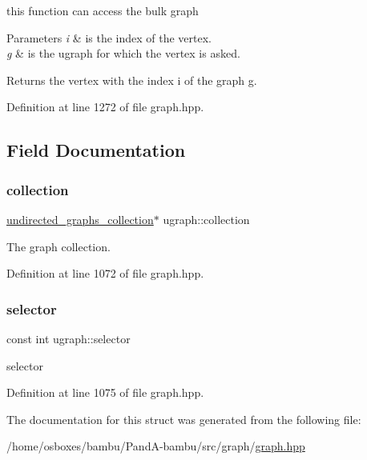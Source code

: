 this function can access the bulk graph 


\begin{DoxyParams}{Parameters}
{\em i} & is the index of the vertex. \\
\hline
{\em g} & is the ugraph for which the vertex is asked. \\
\hline
\end{DoxyParams}
\begin{DoxyReturn}{Returns}
the vertex with the index i of the graph g. 
\end{DoxyReturn}


Definition at line 1272 of file graph.\+hpp.



\subsection{Field Documentation}
\mbox{\label{structugraph_a91e0c8dfe12282bf0b18d38dbac3384a}} 
\subsubsection{\texorpdfstring{collection}{collection}}
{\footnotesize\ttfamily \hyperlink{structundirected__graphs__collection}{undirected\+\_\+graphs\+\_\+collection}$\ast$ ugraph\+::collection\hspace{0.3cm}{\ttfamily [protected]}}



The graph collection. 



Definition at line 1072 of file graph.\+hpp.

\mbox{\label{structugraph_a82bc54b16ffb1a67e1c2e05c98c4b2e6}} 
\subsubsection{\texorpdfstring{selector}{selector}}
{\footnotesize\ttfamily const int ugraph\+::selector\hspace{0.3cm}{\ttfamily [protected]}}



selector 



Definition at line 1075 of file graph.\+hpp.



The documentation for this struct was generated from the following file\+:\begin{DoxyCompactItemize}
\item 
/home/osboxes/bambu/\+Pand\+A-\/bambu/src/graph/\hyperlink{graph_8hpp}{graph.\+hpp}\end{DoxyCompactItemize}
